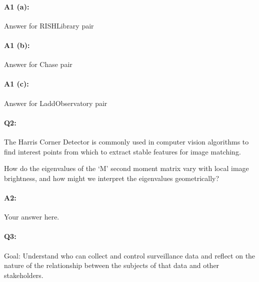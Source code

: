 \paragraph{A1 (a):} Answer for RISHLibrary pair






\pagebreak
\paragraph{A1 (b):} Answer for Chase pair






\pagebreak
\paragraph{A1 (c):} Answer for LaddObservatory pair








\pagebreak
\paragraph{Q2:} 
The Harris Corner Detector is commonly used in computer vision algorithms to find interest points from which to extract stable features for image matching. 

How do the eigenvalues of the `M' second moment matrix vary with local image brightness, and how might we interpret the eigenvalues geometrically?

\paragraph{A2:} Your answer here.






\pagebreak
\paragraph{Q3:} Goal: Understand who can collect and control surveillance data and reflect on the nature of the relationship between the subjects of that data and other stakeholders.

